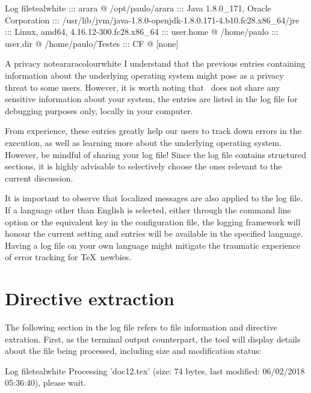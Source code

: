 \begin{codebox}{Log file}{teal}{\icnote}{white}
::: arara @ /opt/paulo/arara
::: Java 1.8.0_171, Oracle Corporation
::: /usr/lib/jvm/java-1.8.0-openjdk-1.8.0.171-4.b10.fc28.x86_64/jre
::: Linux, amd64, 4.16.12-300.fc28.x86_64
::: user.home @ /home/paulo
::: user.dir @ /home/paulo/Testes
::: CF @ [none]
\end{codebox}

\begin{messagebox}{A privacy note}{araracolour}{\icok}{white}
\setlength{\parskip}{1em}
I understand that the previous entries containing information about the underlying operating system might pose as a privacy threat to some users. However, it is worth noting that \arara\ does not share any sensitive information about your system, the entries are listed in the log file for debugging purposes only, locally in your computer.

From experience, these entries greatly help our users to track down errors in the execution, as well as learning more about the underlying operating system. However, be mindful of sharing your log file! Since the log file contains structured sections, it is highly advisable to selectively choose the ones relevant to the current discussion.
\end{messagebox}

It is important to observe that localized messages are also applied to the log file. If a language other than English is selected, either through the  command line option or the equivalent key in the configuration file, the logging framework will honour the current setting and entries will be available in the specified language. Having a log file on your own language might mitigate the traumatic experience of error tracking for \TeX\ newbies.

\section{Directive extraction}
\label{sec:directiveextraction}

The following section in the log file refers to file information and directive extration. First, as the terminal output counterpart, the tool will display details about the file being processed, including size and modification status:

\begin{codebox}{Log file}{teal}{\icnote}{white}
Processing 'doc12.tex' (size: 74 bytes, last modified:
06/02/2018 05:36:40), please wait.
\end{codebox}



